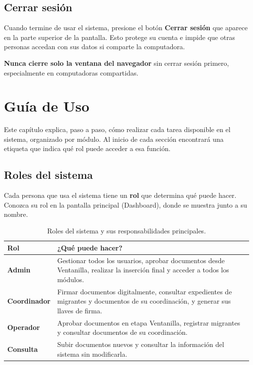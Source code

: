 \documentclass[10pt,letterpaper]{report}
\begin{document}
\section{Cerrar sesión}

Cuando termine de usar el sistema, presione el botón \textbf{Cerrar sesión} que aparece en la parte superior de la pantalla. Esto protege su cuenta e impide que otras personas accedan con sus datos si comparte la computadora.

\begin{alertabox}
\textbf{Nunca cierre solo la ventana del navegador} sin cerrar sesión primero, especialmente en computadoras compartidas.
\end{alertabox}

\chapter{Guía de Uso}

Este capítulo explica, paso a paso, cómo realizar cada tarea disponible en el sistema, organizado por módulo. Al inicio de cada sección encontrará una etiqueta que indica qué rol puede acceder a esa función.

\section{Roles del sistema}

Cada persona que usa el sistema tiene un \textbf{rol} que determina qué puede hacer. Conozca su rol en la pantalla principal (Dashboard), donde se muestra junto a su nombre.

\begin{table}[H]
\centering
\caption{Roles del sistema y sus responsabilidades principales.}
\label{tab:roles}
\begin{tabular}{p{} p{}}
\toprule
\textbf{Rol} & \textbf{¿Qué puede hacer?} \\
\midrule
\textbf{Admin} & Gestionar todos los usuarios, aprobar documentos desde Ventanilla, realizar la inserción final y acceder a todos los módulos. \\[4pt]
\textbf{Coordinador} & Firmar documentos digitalmente, consultar expedientes de migrantes y documentos de su coordinación, y generar sus llaves de firma. \\[4pt]
\textbf{Operador} & Aprobar documentos en etapa Ventanilla, registrar migrantes y consultar documentos de su coordinación. \\[4pt]
\textbf{Consulta} & Subir documentos nuevos y consultar la información del sistema sin modificarla. \\
\bottomrule
\end{tabular}
\end{table}
\end{document}

